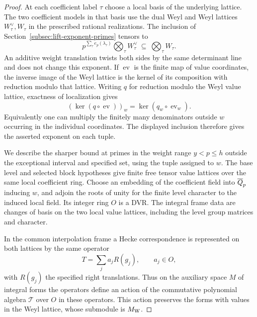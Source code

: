 \begin{proof}
At each coefficient label \(\tau\) choose a local basis of the
underlying lattice. The two coefficient models in that basis
use the dual Weyl and Weyl lattices \(W_\tau^\vee,W_\tau\) in
the prescribed rational realizations. The inclusion of
Section~\ref{subsec:lift-exponent-primes} tensors to
\[
 p^{\sum_\tau e_p(\lambda_\tau)}
          \bigotimes_\tau W_\tau^\vee
       \ \subseteq\  \bigotimes_\tau W_\tau .
\]
An additive weight translation twists both sides by the same
determinant line and does not change this exponent. If
\(\operatorname{ev}\) is the finite map of value coordinates,
the inverse image of the Weyl lattice is the kernel of its
composition with reduction modulo that lattice.
Writing \(q\) for reduction modulo the Weyl value lattice, exactness of localization gives
\[
 (\ker(q\circ\operatorname{ev}))_w=\ker(q_w\circ\operatorname{ev}_w).
\]
Equivalently one can
multiply the finitely many denominators outside \(w\) occurring
in the individual coordinates. The displayed inclusion therefore
gives the asserted exponent on each tuple.
\label{cor:lift-exponent-models-1}


We describe the sharper bound at primes in the weight range
\(y<p\le h\) outside the exceptional interval and specified
set, using the tuple assigned to \(w\). The base level and selected block hypotheses give finite free tensor value lattices over the same local coefficient ring. Choose
an embedding of the coefficient field into \(\overline{Q}_p\)
inducing \(w\), and adjoin the roots of unity for the finite
level character to the induced local field. Its integer ring
\(O\) is a DVR. The integral frame data are changes of basis
on the two local value lattices, including the level group
matrices and character.

In the common interpolation frame a Hecke correspondence is represented on both lattices by the same operator
\[
 T=\sum_j a_j R(g_j),\qquad a_j\in O,
\]
with \(R(g_j)\) the specified right translations. Thus on the auxiliary space \(M\) of
integral forms the operators define an action of the commutative
polynomial algebra \(\mathcal T\) over \(O\) in these operators.
This action preserves the forms with values in the Weyl lattice,
whose submodule is \(M_{\rm W}\).


\end{proof}
